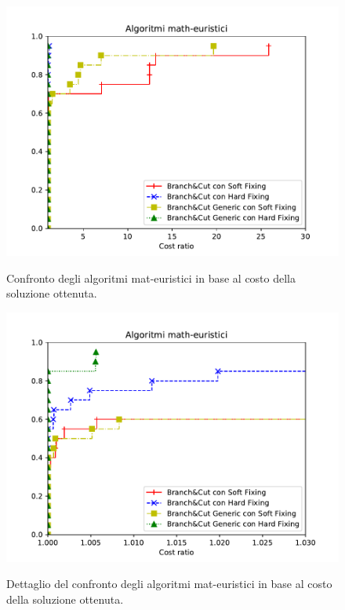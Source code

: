 \begin{figure}[h] 
\begin{center} 
  \includegraphics[scale=0.8]{Images/pp_math-heuristic}\\ 
  \caption{\footnotesize{Confronto degli algoritmi mat-euristici in base al costo della soluzione ottenuta.}}
  \label{pp_mat-heuristic} 
\end{center} 
\end{figure}

\begin{figure}[h] 
\begin{center} 
  \includegraphics[scale=0.8]{Images/pp_math-heuristic_zoom}\\ 
  \caption{\footnotesize{Dettaglio del confronto degli algoritmi mat-euristici in base al costo della soluzione ottenuta.}}
  \label{pp_mat-heuristic_zoom} 
\end{center} 
\end{figure}
\vspace{10cm}

